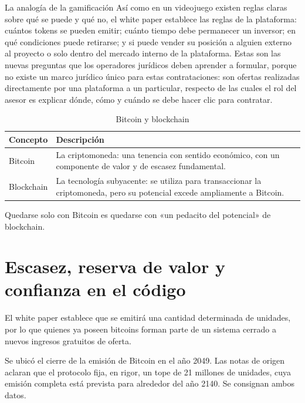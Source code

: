 \documentclass[12pt,oneside]{book}
\begin{document}
\begin{example}{La analogía de la gamificación}
Así como en un videojuego existen reglas claras sobre qué se puede y qué no, el white paper establece las reglas de la plataforma: cuántos tokens se pueden emitir; cuánto tiempo debe permanecer un inversor; en qué condiciones puede retirarse; y si puede vender su posición a alguien externo al proyecto o solo dentro del mercado interno de la plataforma. Estas son las nuevas preguntas que los operadores jurídicos deben aprender a formular, porque no existe un marco jurídico único para estas contrataciones: son ofertas realizadas directamente por una plataforma a un particular, respecto de las cuales el rol del asesor es explicar dónde, cómo y cuándo se debe hacer clic para contratar.
\end{example}

\begin{table}[H]
\centering
\caption{Bitcoin y blockchain}
\renewcommand{\arraystretch}{1.2}
\begin{tabularx}{\textwidth}{>{\raggedright\arraybackslash}p{}X}
\toprule
\textbf{Concepto} & \textbf{Descripción} \\
\midrule
Bitcoin & La criptomoneda: una tenencia con sentido económico, con un componente de valor y de escasez fundamental. \\
Blockchain & La tecnología subyacente: se utiliza para transaccionar la criptomoneda, pero su potencial excede ampliamente a Bitcoin. \\
\bottomrule
\end{tabularx}
\end{table}

Quedarse solo con Bitcoin es quedarse con «un pedacito del potencial» de blockchain.

\section{Escasez, reserva de valor y confianza en el código}

El white paper establece que se emitirá una cantidad determinada de unidades, por lo que quienes ya poseen bitcoins forman parte de un sistema cerrado a nuevos ingresos gratuitos de oferta.

\begin{note}
Se ubicó el cierre de la emisión de Bitcoin en el año 2049. Las notas de origen aclaran que el protocolo fija, en rigor, un tope de 21 millones de unidades, cuya emisión completa está prevista para alrededor del año 2140. Se consignan ambos datos.
\end{note}
\end{document}
